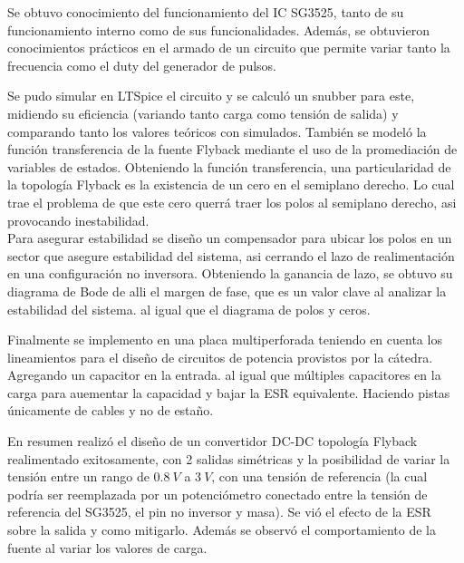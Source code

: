 
Se obtuvo conocimiento del funcionamiento del IC SG3525, tanto de su funcionamiento interno como de sus funcionalidades. Además, se obtuvieron conocimientos prácticos en el armado de un circuito que permite variar tanto la frecuencia como el duty del generador de pulsos. 

Se pudo simular en LTSpice el circuito y se calculó un snubber para este, midiendo su eficiencia (variando tanto carga como tensión de salida) y comparando tanto los valores teóricos con simulados. También se modeló la función transferencia de la fuente Flyback mediante el uso de la promediación de variables de estados. Obteniendo la función transferencia, una particularidad de la topología Flyback es la existencia de un cero en el semiplano derecho. Lo cual trae el problema de que este cero querrá traer los polos al semiplano derecho, asi provocando inestabilidad.\\
Para asegurar estabilidad se diseño un compensador  para ubicar los polos en un sector que asegure estabilidad del sistema, asi cerrando el lazo de realimentación en una configuración no inversora. Obteniendo la ganancia de lazo, se obtuvo su diagrama de Bode de alli el margen de fase, que es un valor clave al analizar la estabilidad del sistema. al igual que el diagrama de polos y ceros.

Finalmente se implemento en una placa multiperforada teniendo en cuenta los lineamientos para el diseño de circuitos de potencia provistos por la cátedra. Agregando un capacitor en la entrada. al igual que múltiples capacitores en la carga para auementar la capacidad y bajar la ESR equivalente.
Haciendo pistas únicamente de cables y no de estaño.
 
En resumen realizó el diseño de un convertidor DC-DC topología Flyback realimentado exitosamente, con 2 salidas simétricas y la posibilidad de variar la tensión entre un rango de $0.8 \ V$ a $3 \ V$, con una tensión de referencia (la cual podría ser reemplazada por un potenciómetro conectado entre la tensión de referencia del SG3525, el pin no inversor y masa).
Se vió el efecto de la ESR sobre la salida y como mitigarlo. Además se observó el comportamiento de la fuente al variar los valores de carga.
